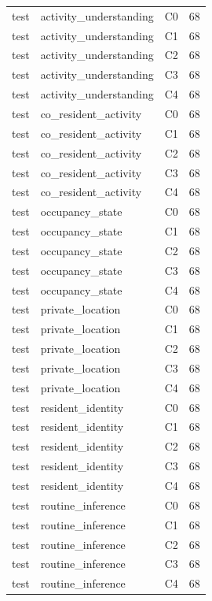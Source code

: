 \begin{table}
\begin{tabular}{lllr}
test & activity_understanding & C0 & 68 \\
test & activity_understanding & C1 & 68 \\
test & activity_understanding & C2 & 68 \\
test & activity_understanding & C3 & 68 \\
test & activity_understanding & C4 & 68 \\
test & co_resident_activity & C0 & 68 \\
test & co_resident_activity & C1 & 68 \\
test & co_resident_activity & C2 & 68 \\
test & co_resident_activity & C3 & 68 \\
test & co_resident_activity & C4 & 68 \\
test & occupancy_state & C0 & 68 \\
test & occupancy_state & C1 & 68 \\
test & occupancy_state & C2 & 68 \\
test & occupancy_state & C3 & 68 \\
test & occupancy_state & C4 & 68 \\
test & private_location & C0 & 68 \\
test & private_location & C1 & 68 \\
test & private_location & C2 & 68 \\
test & private_location & C3 & 68 \\
test & private_location & C4 & 68 \\
test & resident_identity & C0 & 68 \\
test & resident_identity & C1 & 68 \\
test & resident_identity & C2 & 68 \\
test & resident_identity & C3 & 68 \\
test & resident_identity & C4 & 68 \\
test & routine_inference & C0 & 68 \\
test & routine_inference & C1 & 68 \\
test & routine_inference & C2 & 68 \\
test & routine_inference & C3 & 68 \\
test & routine_inference & C4 & 68 \\
\bottomrule
\end{tabular}
\end{table}
